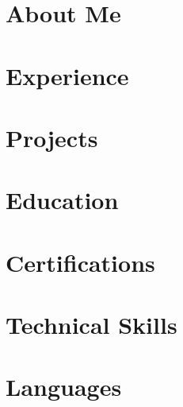 \documentclass{minimal}
\begin{document}
\makecvheader

\section{About Me}
\cvabout

\section{Experience}
\cvexperience

\section{Projects}
\cvprojects

\section{Education}
\cveducation

\section{Certifications}
\cvcertifications

\section{Technical Skills}
\cvskills

\section{Languages}
\cvlanguages
\end{document}
